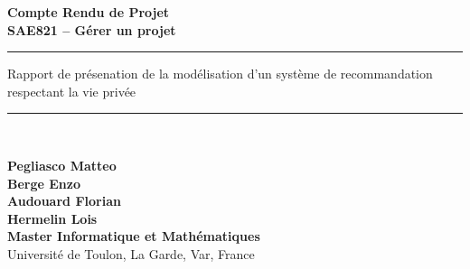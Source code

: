 \documentclass{article}
\date{\vspace{1cm} \today}
\newcommand{\HRule}{\rule{\linewidth}{0.5mm}}
\begin{document}
    \begin{titlepage}
        \centering

        \vspace*{2cm}

        {\Huge\bfseries Compte Rendu de Projet\\[0.5em] \LARGE SAE821 -- Gérer un projet}

        \vspace{1.5cm}

        \HRule
        \vspace{1cm}

        \Large{Rapport de présenation de la modélisation d'un système de recommandation  respectant la vie privée}\\[0.5em]

        \vspace{1cm}
        \HRule\\[11cm]
        \begin{flushleft}
            \small
            \textbf{Pegliasco Matteo}\\
            \textbf{Berge Enzo}\\
            \textbf{Audouard Florian}\\
            \textbf{Hermelin Lois}\\
            \textbf{Master Informatique et Mathématiques}\\
            Université de Toulon, La Garde, Var, France
        \end{flushleft}
        \vfill

    \end{titlepage}
\end{document}
